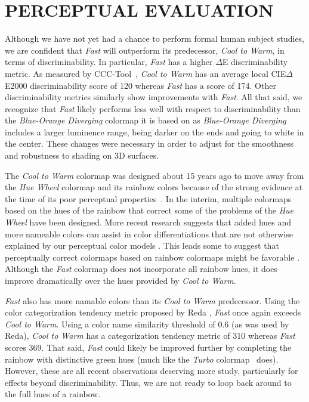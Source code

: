 \documentclass{IEEEcsmag}
\newcommand*{\colormap}[1]{\textsl{#1}\xspace}
\newcommand*{\huewheel}{\colormap{Hue Wheel}}
\newcommand*{\coolwarm}{\colormap{Cool to Warm}}
\newcommand*{\blueorange}{\colormap{Blue-Orange Diverging}}
\newcommand*{\fast}{\colormap{Fast}}
\newcommand*{\turbo}{\colormap{Turbo}}
\begin{document}
\section{PERCEPTUAL EVALUATION}

Although we have not yet had a chance to perform formal human subject studies, we are confident that \fast will outperform its predecessor, \coolwarm, in terms of discriminability.
In particular, \fast has a higher $\Delta$E discriminability metric.
As measured by CCC-Tool~\cite{Nardini2021}, \coolwarm has an average local CIE$\Delta$E2000 discriminability score of 120 whereas \fast has a score of 174. Other discriminability metrics similarly show improvements with \fast.
All that said, we recognize that \fast%
likely performs less well with respect to discriminability than the \blueorange colormap it is based on as \blueorange includes a larger luminence range, being darker on the ends and going to white in the center.
These changes were necessary in order to adjust for the smoothness and robustness to shading on 3D surfaces.

The \coolwarm colormap was designed about 15 years ago to move away from the \huewheel colormap and its rainbow colors because of the strong evidence at the time of its poor perceptual properties~\cite{Rogowitz1998,Borland2007,Ware1988,Light2004}.
In the interim, multiple colormaps based on the hues of the rainbow that correct some of the problems of the \huewheel have been designed.
More recent research suggests that added hues and more nameable colors can assist in color differentiations that are not otherwise explained by our perceptual color models \cite{Reda2021}.
This leads some to suggest that perceptually correct colormaps based on rainbow colormaps might be favorable \cite{Ware2023}.
Although the \fast colormap does not incorporate all rainbow hues, it does improve dramatically over the hues provided by \coolwarm.

\fast also has more namable colors than its \coolwarm predecessor.
Using the color categorization tendency metric proposed by Reda \cite{Reda2022}, \fast once again exceeds \coolwarm.
Using a color name similarity threshold of 0.6 (as was used by Reda), \coolwarm has a categorization tendency metric of 310 whereas \fast scores 369.
That said, \fast could likely be improved further by completing the rainbow with distinctive green hues (much like the \turbo colormap~\cite{Mikhailov2019} does).
However, these are all recent observations deserving more study, particularly for effects beyond discriminability.
Thus, we are not ready to loop back around to the full hues of a rainbow.
\end{document}
